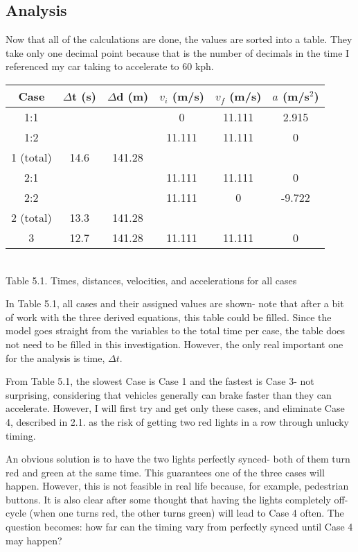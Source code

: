 \documentclass[11pt]{article}
\begin{document}
\subsection{Analysis}

Now that all of the calculations are done, the values are sorted into a table. They take only one decimal point because that is the number of decimals in the time I referenced my car taking to accelerate to 60 kph.

\begin{center}
\centering
\begin{tabular}{|| c | c | c | c | c | c ||}
\hline\hline
\rule{0pt}{3ex} Case & $\Delta$t (s) & $\Delta$d (m) & ${v_i}$ (m/s) & ${v_f}$ (m/s) & ${a}$ (m/s$^2$) \\ [1ex]
\hline 
\rule{0pt}{3ex}1:1 & & & 0 & 11.111 & 2.915 \\
1:2 & & & 11.111 & 11.111 & 0 \\
1 (total) & 14.6 & 141.28 & & & \\
2:1 & & & 11.111 & 11.111 & 0 \\
2:2 & & & 11.111 & 0 & -9.722 \\
2 (total) & 13.3 & 141.28 & & & \\
3 & 12.7 & 141.28 & 11.111 & 11.111 & 0 \\ [1ex]
\hline\hline
\end{tabular}
\label{table:allvalues} \\
Table 5.1. Times, distances, velocities, and accelerations for all cases
\end{center}
 
In Table 5.1, all cases and their assigned values are shown- note that after a bit of work with the three derived equations, this table could be filled. Since the model goes straight from the variables to the total time per case, the table does not need to be filled in this investigation. However, the only real important one for the analysis is time, $\Delta t$.

From Table 5.1, the slowest Case is Case 1 and the fastest is Case 3- not surprising, considering that vehicles generally can brake faster than they can accelerate. However, I will first try and get only these cases, and eliminate Case 4, described in 2.1. as the risk of getting two red lights in a row through unlucky timing.

An obvious solution is to have the two lights perfectly synced- both of them turn red and green at the same time. This guarantees one of the three cases will happen. However, this is not feasible in real life because, for example, pedestrian buttons. It is also clear after some thought that having the lights completely off-cycle (when one turns red, the other turns green) will lead to Case 4 often. The question becomes: how far can the timing vary from perfectly synced until Case 4 may happen?
\end{document}
